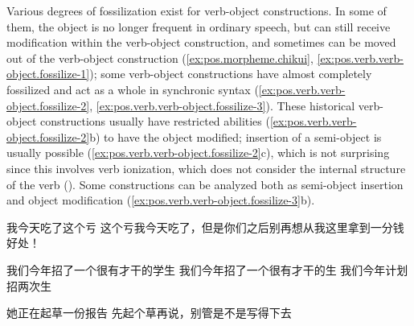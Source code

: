 \documentclass[UTF8, a4paper, oneside, scheme=plain, 12pt]{ctexrep}
\begin{document}
Various degrees of fossilization exist for verb-object constructions. 
In some of them, the object is no longer frequent 
in ordinary speech, 
but can still receive modification within the verb-object construction, 
and sometimes can be moved out of the verb-object construction
(\ref{ex:pos.morpheme.chikui}, \ref{ex:pos.verb.verb-object.fossilize-1}); 
some verb-object constructions have almost completely fossilized 
and act as a whole in synchronic syntax 
(\ref{ex:pos.verb.verb-object.fossilize-2},
\ref{ex:pos.verb.verb-object.fossilize-3}). 
These historical verb-object constructions usually have restricted abilities 
(\ref{ex:pos.verb.verb-object.fossilize-2}b)
to have the object modified; 
insertion of a semi-object is usually possible 
(\ref{ex:pos.verb.verb-object.fossilize-2}c),
which is not surprising since this involves verb ionization, 
which does not consider the internal structure of the verb 
().
Some constructions can be analyzed both 
as semi-object insertion 
and object modification 
(\ref{ex:pos.verb.verb-object.fossilize-3}b). 

\begin{exe}
    \ex\label{ex:pos.verb.verb-object.fossilize-1} \begin{xlist}
        \ex 我今天吃了这个亏
        \ex 这个亏我今天吃了，但是你们之后别再想从我这里拿到一分钱好处！
    \end{xlist}

    \ex\label{ex:pos.verb.verb-object.fossilize-2} \begin{xlist}
        \ex 我们今年招了一个很有才干的学生
        \ex *我们今年招了一个很有才干的生
        \ex 我们今年计划招两次生
    \end{xlist}

    \ex\label{ex:pos.verb.verb-object.fossilize-3} \begin{xlist}
        \ex 她正在起草一份报告
        \ex 先起个草再说，别管是不是写得下去
    \end{xlist}
\end{exe}
\end{document}
